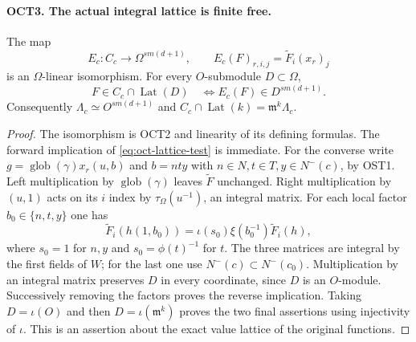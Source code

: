 \documentclass[11pt,a4paper]{article}
\numberwithin{equation}{section}
\theoremstyle{remark}\newtheorem{remark}[theorem]{Remark}
\begin{document}
\paragraph{OCT3. The actual integral lattice is finite free.}
\label{claim:OCT3}
The map
\[
 E_c:C_c\longrightarrow\Omega^{s m(d+1)},\qquad
       E_c(F)_{r,\allowbreak{} i,\allowbreak{} j}=\widetilde F_i(x_r)_j
\]
is an $\Omega$-linear isomorphism.  For every $O$-submodule
$D\subset\Omega$,
\begin{equation}\label{eq:oct-lattice-test}
 F\in C_c\cap\operatorname{Lat}(D)\quad\Longleftrightarrow
          E_c(F)\in D^{s m(d+1)}.
\end{equation}
Consequently $\Lambda_c\simeq O^{s m(d+1)}$ and
$C_c\cap\operatorname{Lat}(k)=\mathfrak m^k\Lambda_c$.
\begin{proof}
The isomorphism is OCT2 and linearity of its defining formulas.
The forward implication of \eqref{eq:oct-lattice-test} is immediate.
For the converse write
$g=\operatorname{glob}(\gamma)x_r(u,\allowbreak{} b)$ and
$b=nty$ with $n\in N,\allowbreak{} t\in T,\allowbreak{} y\in N^-(c)$, by OST1.
Left multiplication by $\operatorname{glob}(\gamma)$ leaves
$\widetilde F$ unchanged.  Right multiplication by $(u,1)$ acts
on its $i$ index by $\tau_\Omega(u^{-1})$, an integral matrix.
For each local factor $b_0\in\{n,\allowbreak{} t,\allowbreak{} y\}$ one has
\[
 \widetilde F_i(h(1,\allowbreak{} b_0))=
          \iota(s_0)\xi(b_0^{-1})\widetilde F_i(h),
\]
where $s_0=1$ for $n,\allowbreak{} y$ and $s_0=\phi(t)^{-1}$ for $t$.
The three matrices are integral by the first fields of $W$;
for the last one use $N^-(c)\subset N^-(c_0)$.  Multiplication
by an integral matrix preserves $D$ in every coordinate, since
$D$ is an $O$-module.  Successively removing the factors proves
the reverse implication.  Taking $D=\iota(O)$ and then
$D=\iota(\mathfrak m^k)$ proves the two final assertions using
injectivity of $\iota$.  This is an assertion about the exact
value lattice of the original functions.
\end{proof}

\end{document}
